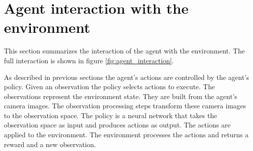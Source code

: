 
\section{Agent interaction with the environment}

This section summarizes the interaction of the agent with the environment. The full interaction is shown in figure \ref{fig:agent_interaction}.

As described in previous sections the agent's actions are controlled by the agent's policy. Given an observation the policy selects actions to execute. The observations represent the environment state. They are built from the agent's camera images. The observation processing steps transform these camera images to the observation space. The policy is a neural network that takes the observation space as input and produces actions as output. 
The actions are applied to the environment. The environment processes the actions and returns a reward and a new observation.



\newcommand{\preprocessedImg}[1]{\texttt{[image: Bilder/image\_printer\_images/agent\_interaction/step\_\#1.png]}}
\newcommand{\observationStack}{\texttt{[image: Bilder/observation\_stack.png]}}


\newcommand\yOffsetHalf{-4}
\newcommand\yOffset{-8}

\newcommand\xOffset{0.5}


